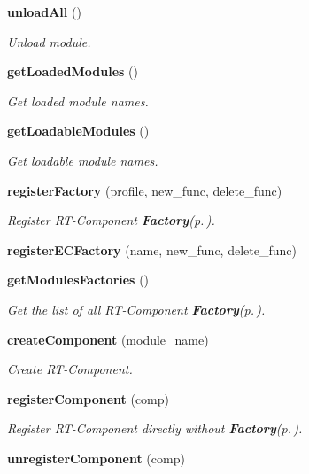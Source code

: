 \begin{CompactItemize}
{\bf unload\-All} ()
\begin{CompactList}\small\item\em Unload module. \item\end{CompactList}\item 
{\bf get\-Loaded\-Modules} ()
\begin{CompactList}\small\item\em Get loaded module names. \item\end{CompactList}\item 
{\bf get\-Loadable\-Modules} ()
\begin{CompactList}\small\item\em Get loadable module names. \item\end{CompactList}\item 
{\bf register\-Factory} (profile, new\_\-func, delete\_\-func)
\begin{CompactList}\small\item\em Register RT-Component {\bf Factory}{\rm (p.\,\pageref{namespaceFactory})}. \item\end{CompactList}\item 
{\bf register\-ECFactory} (name, new\_\-func, delete\_\-func)
\item 
{\bf get\-Modules\-Factories} ()
\begin{CompactList}\small\item\em Get the list of all RT-Component {\bf Factory}{\rm (p.\,\pageref{namespaceFactory})}. \item\end{CompactList}\item 
{\bf create\-Component} (module\_\-name)
\begin{CompactList}\small\item\em Create RT-Component. \item\end{CompactList}\item 
{\bf register\-Component} (comp)
\begin{CompactList}\small\item\em Register RT-Component directly without {\bf Factory}{\rm (p.\,\pageref{namespaceFactory})}. \item\end{CompactList}\item 
{\bf unregister\-Component} (comp)
\item 

\end{CompactItemize}
